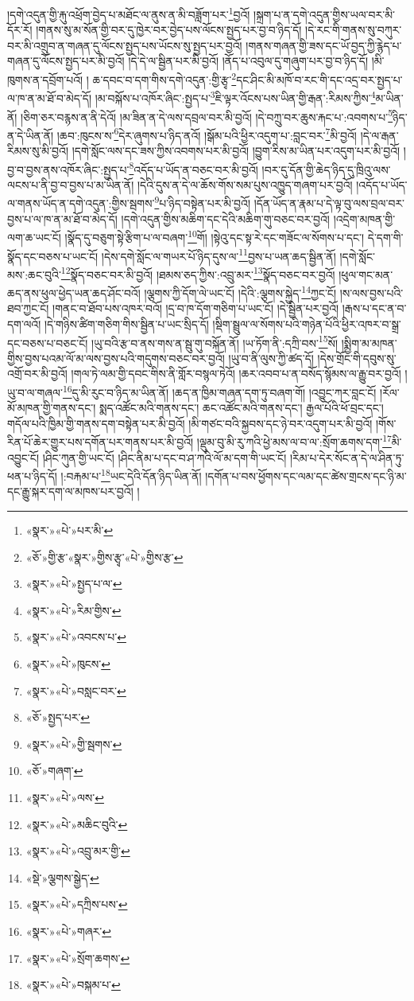 །དགེ་འདུན་གྱི་རྐུ་འཕྲོག་བྱེད་པ་མཐོང་ལ་ནུས་ན་མི་བཟློག་པར་\footnote{«སྣར་»«པེ་»པར་མི་}བྱའོ། །སྐྲག་པ་ན་དགེ་འདུན་གྱིས་ཡལ་བར་མི་དོར་རོ། །གནས་སུ་མ་སོན་གྱི་བར་དུ་ཁྱེར་བར་བྱེད་པས་ལོངས་སྤྱད་པར་བྱ་བ་ཉིད་དོ། །དེ་རང་གི་གནས་སུ་བཀུར་བར་མི་འགྲུབ་ན་གཞན་དུ་ལོངས་སྤྱད་པས་ཡོངས་སུ་སྤྱད་པར་བྱའོ། །གནས་གཞན་གྱི་ཟས་དང་ཡོ་བྱད་ཀྱི་རྙེད་པ་གཞན་དུ་ལོངས་སྤྱད་པར་མི་བྱའོ། །དེ་དེ་ལ་སྦྱིན་པར་མི་བྱའོ། །ནོད་པ་འབུལ་དུ་གཞུག་པར་བྱ་བ་ཉིད་དོ། །མི་ཁུགས་ན་དབྲོག་པའོ། །
ཆ་དབང་བ་དག་གིས་དགེ་འདུན་:གྱི་རྩྭ་\footnote{«ཅོ་»གྱི་རྩ་«སྣར་»གྱིས་རྩྭ་«པེ་»གྱིས་རྩ་}དང་ཤིང་མི་མཁོ་བ་རང་གི་དང་འདྲ་བར་སྤྱད་པ་ལ་ཁ་ན་མ་ཐོ་བ་མེད་དོ། །མ་བསྐོས་པ་འཁོར་ཞིང་:སྤྱད་པ་\footnote{«སྣར་»«པེ་»སྤྱད་པ་ལ་}ཇི་ལྟར་འོངས་པས་ཡིན་གྱི་རྒན་:རིམས་ཀྱིས་\footnote{«སྣར་»«པེ་»རིམ་གྱིས་}མ་ཡིན་ནོ། །ཅིག་ཅར་བརྙས་ན་ནི་དེའོ། །མ་ཟིན་ན་དེ་ལས་དབྲལ་བར་མི་བྱའོ། །དེ་བཀྲུ་བར་ཆུས་རྐང་པ་:འབགས་པ་\footnote{«སྣར་»«པེ་»འབངས་པ་}ཉིད་ན་དེ་ཡིན་ནོ། །ཆབ་:ཁུངས་ས་\footnote{«སྣར་»«པེ་»ཁུངས་}དེར་ཞུགས་པ་ཉིད་ནའོ། །སྒོམ་པའི་ཕྱིར་འདུག་པ་:བླང་བར་\footnote{«སྣར་»«པེ་»བསླང་བར་}མི་བྱའོ། །དེ་ལ་རྒན་རིམས་སུ་མི་བྱའོ། །དགེ་སློང་ལས་དང་ཟས་ཀྱིས་འབགས་པར་མི་བྱའོ། །བྱུག་རིས་མ་ཡིན་པར་འདུག་པར་མི་བྱའོ། །བྱ་བ་བྱས་ནས་འཁོར་ཞིང་:སྤྱད་པ་\footnote{«ཅོ་»སྤྱད་པར་}འདོད་པ་ཡོད་ན་བཅང་བར་མི་བྱའོ། །བར་དུ་དོན་གྱི་ཆེད་ཉིད་དུ་ཁྲིའུ་ལས་ལངས་པ་ནི་བྱ་བ་བྱས་པ་མ་ཡིན་ནོ། །དེའི་དུས་ན་དེ་ལ་ཆོས་གོས་སམ་པུས་འཁྱུད་གཞག་པར་བྱའོ། །འདོད་པ་ཡོད་ལ་གནས་ཡོད་ན་དགེ་འདུན་:གྱིས་སྦགས་\footnote{«སྣར་»«པེ་»གྱི་སྦགས་}པ་ཉིད་བསྟེན་པར་མི་བྱའོ། །དོན་ཡོད་ན་རྣམ་པ་དེ་ལྟ་བུ་ལས་བྲལ་བར་བྱས་པ་ལ་ཁ་ན་མ་ཐོ་བ་མེད་དོ། །དགེ་འདུན་གྱིས་མཆིག་དང་དེའི་མཆིག་གུ་བཅང་བར་བྱའོ། །འདྲེག་མཁན་གྱི་ལག་ཆ་ཡང་ངོ། །སྣོད་དུ་བཅུག་སྟེ་རྩིག་པ་ལ་བཞག་\footnote{«ཅོ་»གཞག་}གོ། །སྟེའུ་དང་སྟ་རེ་དང་གཟོང་ལ་སོགས་པ་དང་། དེ་དག་གི་སྣོད་དང་བཅས་པ་ཡང་ངོ། །དེས་དགེ་སློང་ལ་གཡར་པོ་ཉིད་དུས་ལ་\footnote{«སྣར་»«པེ་»ལས་}བྱས་པ་ཡན་ཆད་སྦྱིན་ནོ། །དགེ་སློང་མས་:ཆང་བུའི་\footnote{«སྣར་»«པེ་»མཆིང་བུའི་}སྣོད་བཅང་བར་མི་བྱའོ། །ཐམས་ཅད་ཀྱིས་:འབྲུ་མར་\footnote{«སྣར་»«པེ་»འབྲུ་མར་གྱི་}སྣོད་བཅང་བར་བྱའོ། །ཕུལ་གང་མན་ཆད་ནས་ཕུལ་ཕྱེད་ཡན་ཆད་ཤོང་བའོ། །ལྕགས་ཀྱི་དོག་ལེ་ཡང་ངོ། །དེའི་:ལྕགས་སྐྱེད་\footnote{«སྡེ་»ལྕགས་སྒྱེད་}ཀྱང་ངོ། །ས་ལས་བྱས་པའི་ཐབ་ཀྱང་ངོ། །གནང་བ་ཐོབ་པས་འཁར་བའོ། །དྲ་བ་ཁ་དོག་གཅིག་པ་ཡང་ངོ། །དེ་སྦྱིན་པར་བྱའོ། །རྒས་པ་དང་ན་བ་དག་ལའོ། །དེ་གཉིས་ཚིག་གཅིག་གིས་སྦྱིན་པ་ཡང་སྲིད་དོ། །སྡིག་སྦྲུལ་ལ་སོགས་པའི་གཉེན་པོའི་ཕྱིར་འཁར་བ་སྒྲ་དང་བཅས་པ་བཅང་ངོ། །ཡུ་བའི་རྩ་བ་ནས་གས་ན་སྦུ་གུ་བསྐོན་ནོ། །ཡ་ཏོག་ནི་:དཀྲི་བས་\footnote{«སྣར་»«པེ་»དཀྲིས་པས་}སོ། །སྨྱིག་མ་མཁན་གྱིས་བྱས་པའམ་ལོ་མ་ལས་བྱས་པའི་གདུགས་བཅང་བར་བྱའོ། །ཡུ་བ་ནི་ལུས་ཀྱི་ཚད་དོ། །དེས་གྲོང་གི་དབུས་སུ་འགྲོ་བར་མི་བྱའོ། །གལ་ཏེ་ལམ་གྱི་དབང་གིས་ནི་གློར་བསྙལ་ཏེའོ། །ཆར་འབབ་པ་ན་བསོད་སྙོམས་ལ་རྒྱུ་བར་བྱའོ། །ཡུ་བ་ལ་གཞལ་\footnote{«སྣར་»«པེ་»གཞར་}དུ་མི་རུང་བ་ཉིད་མ་ཡིན་ནོ། །ཆད་ན་ཁྱིམ་གཞན་དག་ཏུ་བཞག་གོ། །འབྱུང་ཀར་བླང་ངོ། །རོལ་མོ་མཁན་གྱི་གནས་དང་། སྨད་འཚོང་མའི་གནས་དང་། ཆང་འཚོང་མའི་གནས་དང་། རྒྱལ་པོའི་ཕོ་བྲང་དང་། གདོལ་པའི་ཁྱིམ་གྱི་གནས་དག་བསྟེན་པར་མི་བྱའོ། །མི་གཙང་བའི་སྐྱབས་དང་ཉེ་བར་འདུག་པར་མི་བྱའོ། །གོས་རིན་པོ་ཆེར་གྱུར་པས་དགོན་པར་གནས་པར་མི་བྱའོ། །ལྡུམ་བུ་མི་རུ་ཀའི་ཕྱེ་མས་ལ་བ་ལ་:སྲོག་ཆགས་དག་\footnote{«སྣར་»«པེ་»སྲོག་ཆགས་}མི་འབྱུང་ངོ། །ཤིང་ཀུན་གྱི་ཡང་ངོ། །ཤིང་ནིམ་པ་དང་བ་ཤ་ཀའི་ལོ་མ་དག་གི་ཡང་ངོ། །རིམ་པ་དེར་སོང་ན་དེ་ལ་ཤིན་ཏུ་ཕན་པ་ཉིད་དོ། །:བརྐམ་པ་\footnote{«སྣར་»«པེ་»བསྐམ་པ་}ཡང་དེའི་དོན་ཉིད་ཡིན་ནོ། །དགོན་པ་བས་ཕྱོགས་དང་ལམ་དང་ཚེས་གྲངས་དང་ཉི་མ་དང་རྒྱུ་སྐར་དག་ལ་མཁས་པར་བྱའོ། །
